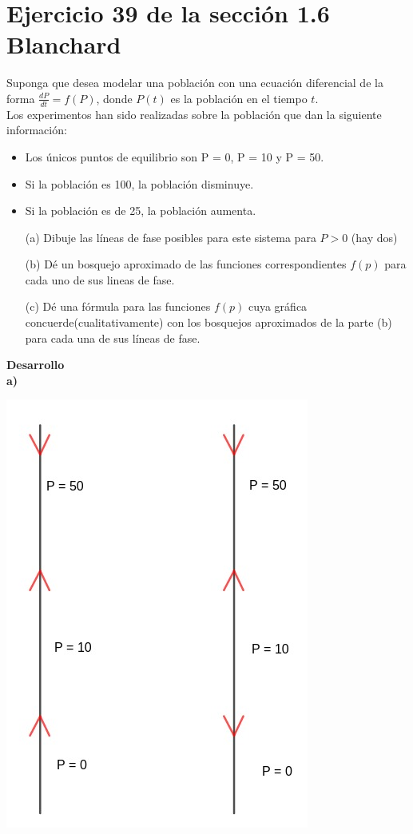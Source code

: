 \documentclass{article}
\numberwithin{equation}{section}
\theoremstyle{plain}  %
\begin{document}
\section{Ejercicio 39  de la sección 1.6 Blanchard}
Suponga que desea modelar una población con 
        una ecuación diferencial de la forma $\frac{dP}{dt}=f(P)$,
        donde $P(t)$ es la población en el tiempo $t$.\\ 
        Los experimentos han sido realizadas sobre la población 
        que dan la siguiente información:
        \begin{itemize}
            \item Los únicos puntos de equilibrio son P = 0,
            P = 10 y P = 50. 
            \item Si la población es 100, la población disminuye. 
            \item Si la población es de 25, la población aumenta. 
        \end{itemize}
        \begin{itemize}
            \item[(a)] Dibuje las líneas de fase posibles para este sistema
            para $P>0$ (hay dos)
            \item[(b)] Dé un bosquejo aproximado de las funciones correspondientes
            $f(p)$ para cada uno de sus lineas de fase.
            \item[(c)] Dé una fórmula para las funciones $f(p)$ cuya gráfica 
            concuerde(cualitativamente) con los bosquejos aproximados
            de la parte (b) para cada una de sus líneas de fase.  
        \end{itemize} 
        \textbf{Desarrollo}\\ 
        \textbf{a)}\\ 
        \begin{center}
            \includegraphics[scale=0.3]{lineas de fase.jpeg}
        \end{center}
\end{document}
